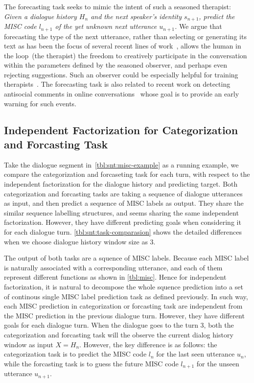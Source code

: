 The forecasting task seeks to mimic the intent of such a seasoned
therapist: \emph{Given a dialogue history $H_n$ and the next speaker's
  identity $s_{n+1}$, predict the MISC code $l_{n+1}$ of the yet
  unknown next utterance $u_{n+1}$.}
We argue that forecasting the type of the next utterance, rather than
selecting or generating its text as has been the focus of several
recent lines of work~\citep[\eg,][]{schatzmann2005quantitative,ubuntu,DSTC7},
allows the human in the loop~(the therapist) the freedom to
creatively participate in the conversation within the parameters
defined by the seasoned observer, and perhaps even rejecting
suggestions. Such an observer could be especially helpful for
training therapists~\citep{imel2017technology}.
%
The forecasting task is also related to recent work on detecting
antisocial comments in online
conversations~\citep{zhang2018conversations} whose goal is to
provide an early warning for such events.


\subsection{Independent Factorization for Categorization and
  Forcasting Task}
\label{ssec:snt:comparative-tasks}
Take the dialogue segment in~\autoref{tbl:snt:misc-example} as a
running example, we compare the categorization and forcaseting task
for each turn, with respect to the independent factorization for the
dialogue history and predicting target. Both categorization and
forcasting tasks are taking a sequence of dialogue utterances as
input, and then predict a sequence of MISC labels as output. They
share the similar sequence labelling structures, and seems sharing the
same independent factorization. However, they have different
predicting goals when considering it for each dialogue turn.
\autoref{tbl:snt:task-comparasion} shows the detailed differences when
we choose dialogue history window size as 3.

 The output of both tasks are a
squence of MISC labels. Because each MISC label is naturally
associated with a corresponding utterance, and each of them represent
different functions as shown in \autoref{tbl:misc}. Hence for
independent factorization, it is natural to decompose the whole
squence prediction into a set of continous single MISC label
prediction task as defined previously. In such way, each MISC
prediction in categorization or forcasting task are independent from
the MISC prediction in the previous dialogue turn. However, they have
different goals for each dialogue turn. When the dialogue goes to the
turn 3, both the categorization and forcasting task will the observe
the current dialog history window as input $X=H_{n}$. However, the key
difference is as follows: the categorization task is to predict the
MISC code $l_{n}$ for the last seen utterance $u_{n}$, while the
forcasting task is to guess the future MISC code $l_{n+1}$ for the
unseen utterance $u_{n+1}$.

